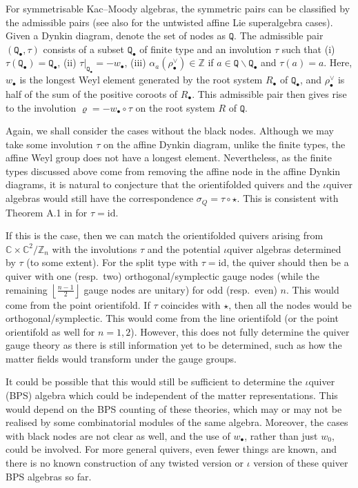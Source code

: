 \documentclass[11pt]{article}
\numberwithin{equation}{section}
\numberwithin{figure}{section}
\numberwithin{table}{section}
\begin{document}
For symmetrisable Kac--Moody algebras, the symmetric pairs can be classified by the admissible pairs \cite{kolb2014quantum} (see also \cite{mudrov2026affine} for the untwisted affine Lie superalgebra cases). Given a Dynkin diagram, denote the set of nodes as $\mathtt{Q}$. The admissible pair $(\mathtt{Q}_\bullet,\tau)$ consists of a subset $\mathtt{Q}_\bullet$ of finite type and an involution $\tau$ such that (i) $\tau(\mathtt{Q}_\bullet)=\mathtt{Q}_\bullet$, (ii) $\tau|_{\mathtt{Q}_\bullet}=-w_\bullet$, (iii) $\alpha_a\left(\rho^\vee_\bullet\right)\in\mathbb{Z}$ if $a\in\mathtt{Q}\backslash\mathtt{Q}_\bullet$ and $\tau(a)=a$. Here, $w_\bullet$ is the longest Weyl element generated by the root system $R_\bullet$ of $\mathtt{Q}_\bullet$, and $\rho^\vee_\bullet$ is half of the sum of the positive coroots of $R_\bullet$. This admissible pair then gives rise to the involution $\varrho=-w_\bullet\circ\tau$ on the root system $R$ of $\mathtt{Q}$.

Again, we shall consider the cases without the black nodes. Although we may take some involution $\tau$ on the affine Dynkin diagram, unlike the finite types, the affine Weyl group does not have a longest element. Nevertheless, as the finite types discussed above come from removing the affine node in the affine Dynkin diagrams, it is natural to conjecture that the orientifolded quivers and the $\iota$quiver algebras would still have the correspondence $\sigma_Q=\tau\circ\star$. This is consistent with Theorem A.1 in \cite{Nakajima:2025utt} for $\tau=\mathrm{id}$.

If this is the case, then we can match the orientifolded quivers arising from $\mathbb{C}\times\mathbb{C}^2/\mathbb{Z}_n$ with the involutions $\tau$ and the potential $\iota$quiver algebras determined by $\tau$ (to some extent). For the split type with $\tau=\mathrm{id}$, the quiver should then be a quiver with one (resp.~two) orthogonal/symplectic gauge nodes (while the remaining $\left\lfloor\frac{n-1}{2}\right\rfloor$ gauge nodes are unitary) for odd (resp.~even) $n$. This would come from the point orientifold. If $\tau$ coincides with $\star$, then all the nodes would be orthogonal/symplectic. This would come from the line orientifold (or the point orientifold as well for $n=1,2$). However, this does not fully determine the quiver gauge theory as there is still information yet to be determined, such as how the matter fields would transform under the gauge groups.

It could be possible that this would still be sufficient to determine the $\iota$quiver (BPS) algebra which could be independent of the matter representations. This would depend on the BPS counting of these theories, which may or may not be realised by some combinatorial modules of the same algebra. Moreover, the cases with black nodes are not clear as well, and the use of $w_\bullet$, rather than just $w_0$, could be involved. For more general quivers, even fewer things are known, and there is no known construction of any twisted version or $\iota$ version of these quiver BPS algebras so far.
\end{document}
